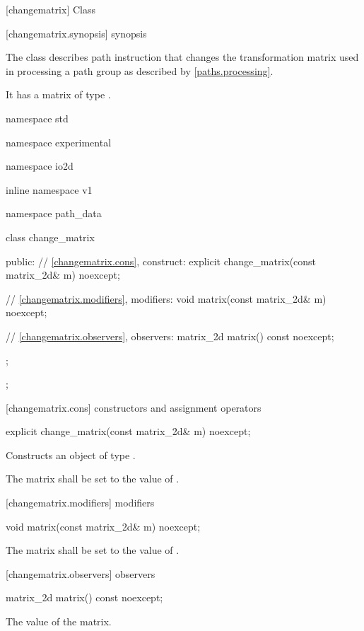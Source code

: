  [changematrix] {Class }

 [changematrix.synopsis] { synopsis}

\pnum
{}
The class  describes path instruction that changes the transformation matrix used in processing a path group as described by \ref{paths.processing}.

\pnum
It has a matrix of type .

\begin{codeblock}
namespace std { namespace experimental { namespace io2d { inline namespace v1 {
  namespace path_data {
    class change_matrix {
    public:
      // \ref{changematrix.cons}, construct:
      explicit change_matrix(const matrix_2d& m) noexcept;

      // \ref{changematrix.modifiers}, modifiers:
      void matrix(const matrix_2d& m) noexcept;

      // \ref{changematrix.observers}, observers:
      matrix_2d matrix() const noexcept;
    };
  };
} } } }
\end{codeblock}

 [changematrix.cons] { constructors and assignment operators}

\begin{itemdecl}
    explicit change_matrix(const matrix_2d& m) noexcept;
\end{itemdecl}
\begin{itemdescr}
	\pnum
	\effects
	Constructs an object of type .
	
	\pnum
	The matrix shall be set to the value of .
\end{itemdescr}

 [changematrix.modifiers]{ modifiers}

\begin{itemdecl}
    void matrix(const matrix_2d& m) noexcept;
\end{itemdecl}
\begin{itemdescr}
	\pnum
	\effects
	The matrix shall be set to the value of .
\end{itemdescr}

 [changematrix.observers]{ observers}

\begin{itemdecl}
    matrix_2d matrix() const noexcept;
\end{itemdecl}
\begin{itemdescr}
	\pnum
	\returns
	The value of the matrix.
\end{itemdescr}
